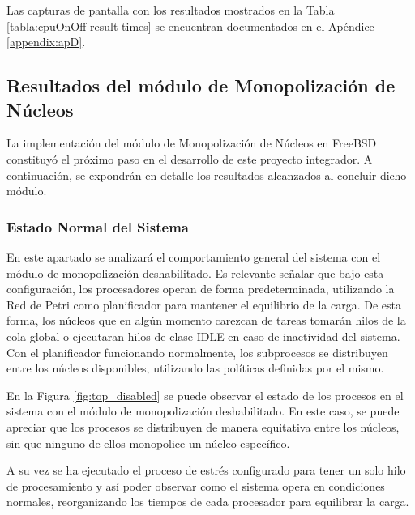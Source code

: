 Las capturas de pantalla con los resultados mostrados en la Tabla \ref{tabla:cpuOnOff-result-times} se encuentran documentados en el Apéndice \ref{appendix:apD}.


\subsection{Resultados del módulo de Monopolización de Núcleos}

La implementación del módulo de Monopolización de Núcleos en FreeBSD constituyó el próximo paso en el desarrollo de este proyecto integrador. A continuación, se expondrán en detalle los resultados alcanzados al concluir dicho módulo.\par

\subsubsection{Estado Normal del Sistema}

En este apartado se analizará el comportamiento general del sistema con el módulo de monopolización deshabilitado. Es relevante señalar que bajo esta configuración, los procesadores operan de forma predeterminada, utilizando la Red de Petri como planificador para mantener el equilibrio de la carga. De esta forma, los núcleos que en algún momento carezcan de tareas tomarán hilos de la cola global o ejecutaran hilos de clase IDLE en caso de inactividad del sistema. Con el planificador funcionando normalmente, los subprocesos se distribuyen entre los núcleos disponibles, utilizando las políticas definidas por el mismo.\par

En la Figura \ref{fig:top_disabled} se puede observar el estado de los procesos en el sistema con el módulo de monopolización deshabilitado. En este caso, se puede apreciar que los procesos se distribuyen de manera equitativa entre los núcleos, sin que ninguno de ellos monopolice un núcleo específico.\par

A su vez se ha ejecutado el proceso de estrés configurado para tener un solo hilo de procesamiento y así poder observar como el sistema opera en condiciones normales, reorganizando los tiempos de cada procesador para equilibrar la carga.\par

